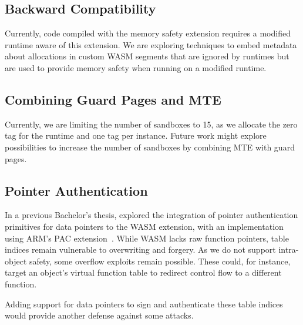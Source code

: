 \subsection{Backward Compatibility}
\label{subsec:backward-compatibility}

Currently, code compiled with the memory safety extension requires a modified runtime aware of this extension.
We are exploring techniques to embed metadata about allocations in custom \ac{WASM} segments that are ignored by runtimes but are used to provide memory safety when running on a modified runtime.

\subsection{Combining Guard Pages and \ac{MTE}}
\label{subsec:combining-guard-pages-and-mte}

Currently, we are limiting the number of sandboxes to 15, as we allocate the zero tag for the runtime and one tag per instance.
Future work might explore possibilities to increase the number of sandboxes by combining \ac{MTE} with guard pages.

\subsection{Pointer Authentication}
\label{subsec:future-work-pac}

In a previous Bachelor's thesis, \citeauthor{rehde2023wasm} explored the integration of pointer authentication primitives for data pointers to the \ac{WASM} extension, with an implementation using ARM's \ac{PAC} extension~\cite{rehde2023wasm}.
While \ac{WASM} lacks raw function pointers, table indices remain vulnerable to overwriting and forgery.
As we do not support intra-object safety, some overflow exploits remain possible.
These could, for instance, target an object's virtual function table to redirect control flow to a different function.

Adding support for data pointers to sign and authenticate these table indices would provide another defense against some attacks.
